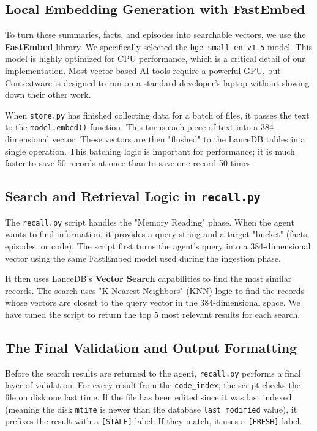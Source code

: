 \documentclass[conference]{IEEEtran}
\begin{document}
\subsection{Local Embedding Generation with FastEmbed}
To turn these summaries, facts, and episodes into searchable vectors, we use the \textbf{FastEmbed} library. We specifically selected the \texttt{bge-small-en-v1.5} model. This model is highly optimized for CPU performance, which is a critical detail of our implementation. Most vector-based AI tools require a powerful GPU, but Contextware is designed to run on a standard developer's laptop without slowing down their other work.

When \texttt{store.py} has finished collecting data for a batch of files, it passes the text to the \texttt{model.embed()} function. This turns each piece of text into a 384-dimensional vector. These vectors are then "flushed" to the LanceDB tables in a single operation. This batching logic is important for performance; it is much faster to save 50 records at once than to save one record 50 times.

\subsection{Search and Retrieval Logic in \texttt{recall.py}}
The \texttt{recall.py} script handles the "Memory Reading" phase. When the agent wants to find information, it provides a query string and a target "bucket" (facts, episodes, or code). The script first turns the agent's query into a 384-dimensional vector using the same FastEmbed model used during the ingestion phase.

It then uses LanceDB's \textbf{Vector Search} capabilities to find the most similar records. The search uses "K-Nearest Neighbors" (KNN) logic to find the records whose vectors are closest to the query vector in the 384-dimensional space. We have tuned the script to return the top 5 most relevant results for each search.

\subsection{The Final Validation and Output Formatting}
Before the search results are returned to the agent, \texttt{recall.py} performs a final layer of validation. For every result from the \texttt{code\_index}, the script checks the file on disk one last time. If the file has been edited since it was last indexed (meaning the disk \texttt{mtime} is newer than the database \texttt{last\_modified} value), it prefixes the result with a \texttt{[STALE]} label. If they match, it uses a \texttt{[FRESH]} label.
\end{document}
